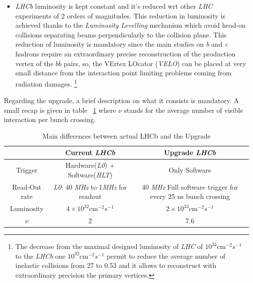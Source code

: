 \documentclass[paper=a4, fontsize=10pt]{scrartcl}
\numberwithin{equation}{section}		%
\numberwithin{figure}{section}			%
\numberwithin{table}{section}				%
\begin{document}
\begin{itemize}
\item{\textit{LHCb} luminosity is kept constant and it's reduced wrt other \textit{LHC} experiments of 2 orders of magnitudes. This reduction in luminosity is achieved thanks to the \textit{Luminosity Levelling} mechanism which avoid head-on collisions separating beams perpendicularly to the collision plane. This reduction of luminosity is mandatory since the main studies on \textit{b} and \textit{c} hadrons require an extraordinary precise reconstruction of the production vertex of the $b\overline{b}$ pairs, so, the VErtex LOcator (\textit{VELO}) can be placed at very small distance from the interaction point limiting problems coming from radiation damages. \footnote{The decrease from the maximal designed luminosity of \textit{LHC} of $10^{34}$cm$^{-2}s^{-1}$ to the \textit{LHCb} one  $10^{32}$cm$^{-2}s^{-1}$ permit to reduce the average number of inelastic collisions from 27 to 0.53 and it allows to reconstruct with extraordinary precision the primary vertices.}}
\end{itemize}

Regarding the upgrade, a brief description on what it consists is mandatory. A small recap is given in table ~\ref{table:runningCondition} where $\nu$ stands for the average number of visible interaction per bunch crossing.

\begin{table}[h]
\centering
\begin{tabular}{|c|c|c|}
\hline
           & \textbf{Current \textit{LHCb}}          & \textbf{Upgrade \textit{LHCb}} \\ \hline
Trigger    & Hardware(\textit{L0}) + Software(\textit{HLT}) & Only Software \\ \hline
Read-Out rate & \textit{L0}: 40 \textit{MHz} to 1\textit{MHz} for readout & 40 \textit{MHz} Full software trigger for every 25 ns bunch crossing \\ \hline
Luminosity & $4 \times 10 ^{32}$cm$^{-2}s^{-1}$ & $2\times 10^{33}$cm$^{-2}s^{-1}$ \\ \hline
$\nu $ & 2 & 7.6 \\ \hline

\end{tabular}
\caption{Main differences between actual LHCb and the Upgrade}\label{table:runningCondition}
\end{table}
\end{document}
